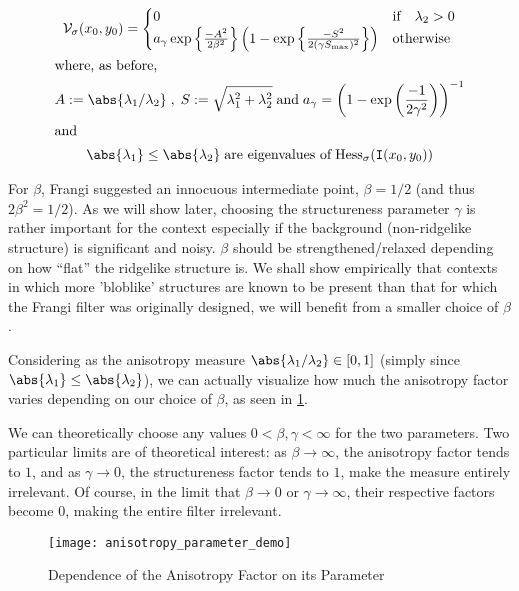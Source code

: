 \begin{gather} \label{eq:frangi-vesselness-measure-v1}
\Vsigma(x_0,y_0) = \begin{cases}
0 & \text{if} \quad \lambda_2 > 0 \\
a_\gamma \exp\left\{\frac{-A^2}{2\beta^2}\right\}
\left(1 - \exp\left\{\frac{-S^2}{2(\gamma S_{\max})^2}\right\}\right) & \text{otherwise}
\end{cases} \\
\shortintertext{where, as before,}
A := \abs{\lambda_1 / \lambda_2}
\;,\;
S := \sqrt{\lambda_1^2 + \lambda_2^2}
\;\textrm{and}\;
a_\gamma = \left(1-\exp\left(\frac{-1}{2\gamma^2}\right)\right)^{-1} \notag\\
\shortintertext{and}
\abs{\lambda_1} \le \abs{\lambda_2}
\; \textrm{are eigenvalues of}\; \Hess_\sigma(\img(x_0, y_0)) \notag
\end{gather}

For $\beta$, Frangi suggested an innocuous intermediate point, $\beta=1/2$ (and thus $2\beta^2 = 1/2$).
As we will show later, choosing the structureness parameter $\gamma$ is rather important for the context especially if the background (non-ridgelike structure) is significant and noisy. $\beta$ should be strengthened/relaxed depending on how ``flat'' the ridgelike structure is. We shall show empirically that contexts in which more 'bloblike' structures are known to be present than that for which the Frangi filter was originally designed, we will benefit from a smaller choice of $\beta$.

Considering as the anisotropy measure $\abs{\lambda_1 / \lambda_2} \in [0,1]$ (simply since $\abs{\lambda_1} \le \abs{\lambda_2}$), we can actually visualize how much the 
anisotropy factor varies depending on our choice of $\beta$, as seen in \cref{fig:anisotropy-parameter-demo}.

We can theoretically choose any values $0 < \beta, \gamma < \infty$ for the two parameters. Two particular limits are of theoretical interest:
as $\beta \to \infty$, the anisotropy factor tends to $1$, and as $\gamma \to 0$, the structureness factor tends to $1$, make the measure entirely irrelevant. Of course, in the limit that $\beta \to 0$ or $\gamma \to \infty$, their respective factors become 0, making the entire filter irrelevant.
\begin{figure}
  \texttt{[image: anisotropy\_parameter\_demo]}
  \caption{Dependence of the Anisotropy Factor on its Parameter}
  \label{fig:anisotropy-parameter-demo}
\end{figure}

